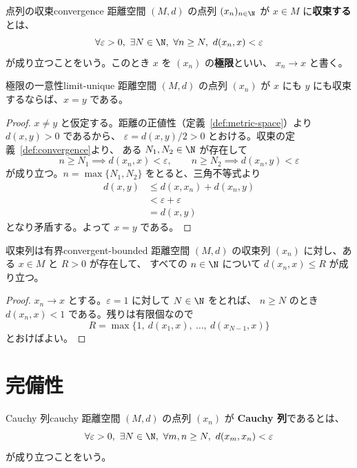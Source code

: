 \begin{definition}{点列の収束}{convergence}
距離空間 $(M, d)$ の点列 $(x_n)_{n \in \N}$ が $x \in M$ に\textbf{収束する}とは、
\[
  \forall \varepsilon > 0,\ \exists N \in \N,\ \forall n \geq N,\ d(x_n, x) < \varepsilon
\]
が成り立つことをいう。このとき $x$ を $(x_n)$ の\textbf{極限}といい、
$x_n \to x$ と書く。
\end{definition}

\begin{proposition}{極限の一意性}{limit-unique}
距離空間 $(M, d)$ の点列 $(x_n)$ が $x$ にも $y$ にも収束するならば、$x = y$ である。
\end{proposition}

\begin{proof}
$x \neq y$ と仮定する。距離の正値性（定義~\ref{def:metric-space}）より $d(x, y) > 0$ であるから、
$\varepsilon = d(x, y) / 2 > 0$ とおける。収束の定義~\ref{def:convergence}より、
ある $N_1, N_2 \in \N$ が存在して
\[
  n \geq N_1 \implies d(x_n, x) < \varepsilon,
  \qquad
  n \geq N_2 \implies d(x_n, y) < \varepsilon
\]
が成り立つ。$n = \max\{N_1, N_2\}$ をとると、三角不等式より
\begin{align*}
  d(x, y)
  &\leq d(x, x_n) + d(x_n, y) \\
  &< \varepsilon + \varepsilon \\
  &= d(x, y)
\end{align*}
となり矛盾する。よって $x = y$ である。
\end{proof}

\begin{lemma}{収束列は有界}{convergent-bounded}
距離空間 $(M, d)$ の収束列 $(x_n)$ に対し、ある $x \in M$ と $R > 0$ が存在して、
すべての $n \in \N$ について $d(x_n, x) \leq R$ が成り立つ。
\end{lemma}

\begin{proof}
$x_n \to x$ とする。$\varepsilon = 1$ に対して $N \in \N$ をとれば、
$n \geq N$ のとき $d(x_n, x) < 1$ である。残りは有限個なので
\[
  R = \max\{1,\ d(x_1, x),\ \ldots,\ d(x_{N-1}, x)\}
\]
とおけばよい。
\end{proof}

\section{完備性}
\label{sec:completeness}

\begin{definition}{Cauchy 列}{cauchy}
距離空間 $(M, d)$ の点列 $(x_n)$ が \textbf{Cauchy 列}であるとは、
\[
  \forall \varepsilon > 0,\ \exists N \in \N,\ \forall m, n \geq N,\ d(x_m, x_n) < \varepsilon
\]
が成り立つことをいう。
\end{definition}

